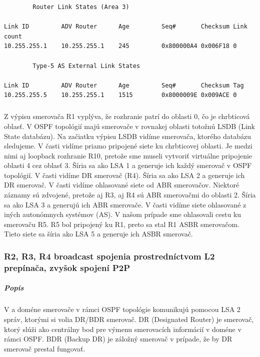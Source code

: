 \documentclass[12pt,twoside,a4paper]{article}
\begin{document}
{\begin{small}
\begin{verbatim}
		Router Link States (Area 3)

Link ID         ADV Router      Age         Seq#       Checksum Link count
10.255.255.1    10.255.255.1    245         0x800000A4 0x006F18 0

		Type-5 AS External Link States

Link ID         ADV Router      Age         Seq#       Checksum Tag
10.255.255.5    10.255.255.1    1515        0x8000009E 0x009ACE 0

\end{verbatim}
\end{small}
}

\subparagraph{}
Z výpisu  smerovača R1 vyplýva, že rozhranie  patrí do oblasti 0, čo je chrbticová oblasť. V OSPF topológií majú smerovače v rovnakej oblasti totožnú LSDB (Link State databázu). Na začiatku výpisu LSDB vidíme  smerovača, ktorého databázu sledujeme. V časti  vidíme priamo pripojené siete ku chrbticovej oblasti. Je medzi nimi aj loopback rozhranie R10, pretože sme museli vytvoriť virtuálne pripojenie oblasti 4 cez oblasť 3. Šíria sa ako LSA 1 a generuje ich každý smerovač v OSPF topológií. V časti  vidíme DR smerovač (R4). Šíria sa ako LSA 2 a generuje ich DR smerovač. V časti  vidíme ohlasované siete od ABR smerovačov. Niektoré záznamy sú zdvojené, pretože aj R3, aj R4 sú ABR smerovačmi do oblasti 2. Šíria sa ako LSA 3 a generujú ich ABR smerovače. V časti  vidíme siete ohlasované z iných autonómnych systémov (AS). V našom prípade sme ohlasovali cestu ku smerovaču R5. R5 bol pripojený ku R1, preto sa stal R1 ASBR smerovačom. Tieto siete sa šíria ako LSA 5 a generuje ich ASBR smerovač.



\subsubsection*{R2, R3, R4 broadcast spojenia prostredníctvom L2 prepínača, zvyšok spojení P2P}
\subparagraph{Popis}
\subparagraph{}
V  a  doméne smerovače v rámci OSPF topológie komunikujú pomocou LSA 2 správ, ktorými si volia DR/BDR smerovač. DR (Designated Router) je smerovač, ktorý slúži ako centrálny bod pre výmenu smerovacích informácií v  doméne v rámci OSPF. BDR (Backup DR) je záložný smerovač v prípade, že by DR smerovač prestal fungovať.
\end{document}
